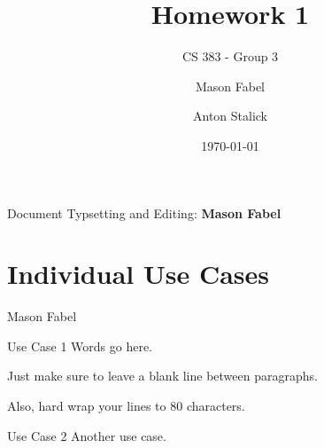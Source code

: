 \documentclass[12pt]{report}
\title{Homework 1}
\subtitle{CS 383 - Group 3}
\author{
Mason Fabel \\
\and Anton Stalick \\
}
\date{\today}
\begin{document}
\maketitle

\tableofcontents
Document Typsetting and Editing: \textbf{Mason Fabel}
\clearpage

\chapter{Individual Use Cases}






\begin{section}{Mason Fabel}
\begin{subsection}{Use Case 1}
Words go here.

Just make sure to leave a blank line between paragraphs.

Also, hard wrap your lines to 80 characters.
\end{subsection}

\begin{subsection}{Use Case 2}
Another use case.
\end{subsection}
\end{section}
\end{document}
